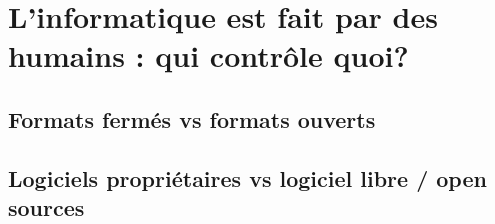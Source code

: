 \documentclass{beamer}
\begin{document}










\section[Qui contrôle quoi?]{L'informatique est fait par des humains : qui contrôle quoi?}
\subsection{Formats fermés vs formats ouverts}
\subsection{Logiciels propriétaires vs logiciel libre / open sources} %
\end{document}
